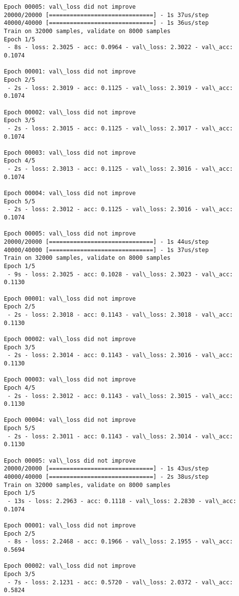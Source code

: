 \documentclass[11pt]{article}
\begin{document}
\begin{Verbatim}[commandchars=\\\{\}]
Epoch 00005: val\_loss did not improve
20000/20000 [==============================] - 1s 37us/step
40000/40000 [==============================] - 1s 36us/step
Train on 32000 samples, validate on 8000 samples
Epoch 1/5
 - 8s - loss: 2.3025 - acc: 0.0964 - val\_loss: 2.3022 - val\_acc: 0.1074

Epoch 00001: val\_loss did not improve
Epoch 2/5
 - 2s - loss: 2.3019 - acc: 0.1125 - val\_loss: 2.3019 - val\_acc: 0.1074

Epoch 00002: val\_loss did not improve
Epoch 3/5
 - 2s - loss: 2.3015 - acc: 0.1125 - val\_loss: 2.3017 - val\_acc: 0.1074

Epoch 00003: val\_loss did not improve
Epoch 4/5
 - 2s - loss: 2.3013 - acc: 0.1125 - val\_loss: 2.3016 - val\_acc: 0.1074

Epoch 00004: val\_loss did not improve
Epoch 5/5
 - 2s - loss: 2.3012 - acc: 0.1125 - val\_loss: 2.3016 - val\_acc: 0.1074

Epoch 00005: val\_loss did not improve
20000/20000 [==============================] - 1s 44us/step
40000/40000 [==============================] - 1s 37us/step
Train on 32000 samples, validate on 8000 samples
Epoch 1/5
 - 9s - loss: 2.3025 - acc: 0.1028 - val\_loss: 2.3023 - val\_acc: 0.1130

Epoch 00001: val\_loss did not improve
Epoch 2/5
 - 2s - loss: 2.3018 - acc: 0.1143 - val\_loss: 2.3018 - val\_acc: 0.1130

Epoch 00002: val\_loss did not improve
Epoch 3/5
 - 2s - loss: 2.3014 - acc: 0.1143 - val\_loss: 2.3016 - val\_acc: 0.1130

Epoch 00003: val\_loss did not improve
Epoch 4/5
 - 2s - loss: 2.3012 - acc: 0.1143 - val\_loss: 2.3015 - val\_acc: 0.1130

Epoch 00004: val\_loss did not improve
Epoch 5/5
 - 2s - loss: 2.3011 - acc: 0.1143 - val\_loss: 2.3014 - val\_acc: 0.1130

Epoch 00005: val\_loss did not improve
20000/20000 [==============================] - 1s 43us/step
40000/40000 [==============================] - 2s 38us/step
Train on 32000 samples, validate on 8000 samples
Epoch 1/5
 - 13s - loss: 2.2963 - acc: 0.1118 - val\_loss: 2.2830 - val\_acc: 0.1074

Epoch 00001: val\_loss did not improve
Epoch 2/5
 - 8s - loss: 2.2468 - acc: 0.1966 - val\_loss: 2.1955 - val\_acc: 0.5694

Epoch 00002: val\_loss did not improve
Epoch 3/5
 - 7s - loss: 2.1231 - acc: 0.5720 - val\_loss: 2.0372 - val\_acc: 0.5824


\end{Verbatim}
\end{document}
